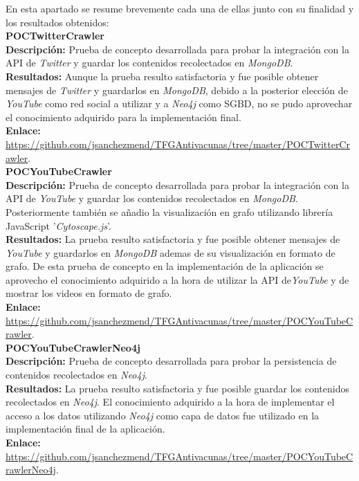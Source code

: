 \documentclass[11pt,a4paper]{article}
\begin{document}
En esta apartado se resume brevemente cada una de ellas junto con su finalidad y los resultados obtenidos:
\\

\noindent\textbf{POCTwitterCrawler}\\
\textbf{Descripción:} Prueba de concepto desarrollada para probar la integración con la API de \textit{Twitter} y guardar los contenidos recolectados en \textit{MongoDB}.\\
\textbf{Resultados:} Aunque la prueba resulto satisfactoria y fue posible obtener mensajes de \textit{Twitter} y guardarlos en \textit{MongoDB}, debido a la posterior elección de \textit{YouTube} como red social a utilizar y a \textit{Neo4j} como SGBD, no se pudo aprovechar el conocimiento adquirido para la implementación final.\\
\textbf{Enlace:} \url{https://github.com/jsanchezmend/TFGAntivacunas/tree/master/POCTwitterCrawler}.
\\

\noindent\textbf{POCYouTubeCrawler}\\
\textbf{Descripción:} Prueba de concepto desarrollada para probar la integración con la API de \textit{YouTube} y guardar los contenidos recolectados en \textit{MongoDB}. Posteriormente también se añadio la visualización en grafo utilizando librería JavaScript '\textit{Cytoscape.js}'.\\
\textbf{Resultados:} La prueba resulto satisfactoria y fue posible obtener mensajes de \textit{YouTube} y guardarlos en \textit{MongoDB} ademas de su visualización en formato de grafo. De esta prueba de concepto en la implementación de la aplicación se aprovecho el conocimiento adquirido a la hora de utilizar la API de\textit{YouTube} y de mostrar los videos en formato de grafo.\\
\textbf{Enlace:} \url{https://github.com/jsanchezmend/TFGAntivacunas/tree/master/POCYouTubeCrawler}.
\\

\noindent\textbf{POCYouTubeCrawlerNeo4j}\\
\textbf{Descripción:} Prueba de concepto desarrollada para probar la persistencia de contenidos recolectados en \textit{Neo4j}.\\
\textbf{Resultados:} La prueba resulto satisfactoria y fue posible guardar los contenidos recolectados en \textit{Neo4j}. El conocimiento adquirido a la hora de implementar el acceso a los datos utilizando \textit{Neo4j} como capa de datos fue utilizado en la implementación final de la aplicación.\\
\textbf{Enlace:} \url{https://github.com/jsanchezmend/TFGAntivacunas/tree/master/POCYouTubeCrawlerNeo4j}.
\\
\end{document}
